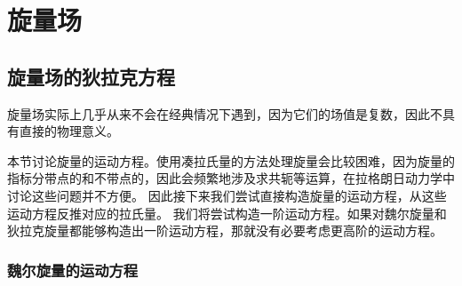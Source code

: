 \documentclass[hyperref, UTF8, a4paper]{ctexart}
\begin{document}
\section{旋量场}

\subsection{旋量场的狄拉克方程}

旋量场实际上几乎从来不会在经典情况下遇到，因为它们的场值是复数，因此不具有直接的物理意义。

本节讨论旋量的运动方程。使用凑拉氏量的方法处理旋量会比较困难，因为旋量的指标分带点的和不带点的，因此会频繁地涉及求共轭等运算，在拉格朗日动力学中讨论这些问题并不方便。
因此接下来我们尝试直接构造旋量的运动方程，从这些运动方程反推对应的拉氏量。
我们将尝试构造一阶运动方程。如果对魏尔旋量和狄拉克旋量都能够构造出一阶运动方程，那就没有必要考虑更高阶的运动方程。

\subsubsection{魏尔旋量的运动方程} 
\end{document}
